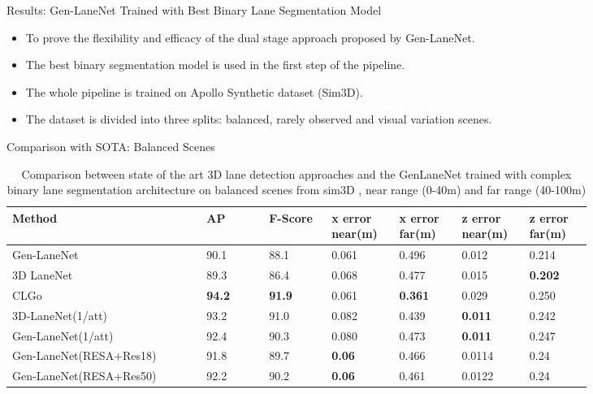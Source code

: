 \documentclass[aspectratio=169]{beamer}
\begin{document}
\begin{frame}{Results: Gen-LaneNet Trained with Best Binary Lane Segmentation Model }
\begin{itemize}
    \item To prove the flexibility and efficacy of the dual stage approach proposed by Gen-LaneNet.
    \item The best binary segmentation model is used in the first step of the pipeline. 
    \item The whole pipeline is trained on Apollo Synthetic dataset (Sim3D).
    \item The dataset is divided into three splits: balanced, rarely observed and visual variation scenes.
\end{itemize}
\end{frame}


\begin{frame}{Comparison with SOTA: Balanced Scenes}
\begin{table}[h]
    \small
    \addtolength{\tabcolsep}{-1pt}
    \begin{center}
    \caption{Comparison between state of the art 3D lane detection approaches and the GenLaneNet trained with complex binary lane segmentation architecture on balanced scenes from sim3D , near range (0-40m) and far range (40-100m)}
    \begin{tabular}{|p{0.29\linewidth}|p{0.09\linewidth}|p{0.09\linewidth}|p{0.09\linewidth}|p{0.09\linewidth}|p{0.09\linewidth}|p{0.09\linewidth}|}
    \hline
        \textbf{Method} & \textbf{AP} & \textbf{F-Score} & \textbf{x error near(m)} & \textbf{x error far(m)} & \textbf{z error near(m)} & \textbf{z error far(m)} \\ \hline
        Gen-LaneNet & 90.1 & 88.1 & 0.061 & 0.496 & 0.012 & 0.214 \\ \hline
        3D LaneNet & 89.3 & 86.4 & 0.068 & 0.477 & 0.015 & \textbf{0.202} \\ \hline
        CLGo & \textbf{94.2} &\textbf{ 91.9} & 0.061 & \textbf{0.361} & 0.029 & 0.250 \\ \hline
        3D-LaneNet(1/att)  &  93.2 & 91.0 & 0.082 & 0.439 & \textbf{0.011} & 0.242 \\ \hline
        Gen-LaneNet(1/att)& 92.4 & 90.3 & 0.080 & 0.473 & \textbf{0.011} & 0.247 \\ \hline
        Gen-LaneNet(RESA+Res18) & 91.8 & 89.7 & \textbf{0.06} & 0.466 & 0.0114 & 0.24 \\ \hline
        Gen-LaneNet(RESA+Res50) & 92.2 & 90.2 &\textbf{ 0.06} & 0.461 & 0.0122 & 0.24 \\ \hline
    \end{tabular}
    \end{center}
    \end{table}

\end{frame}
\end{document}
